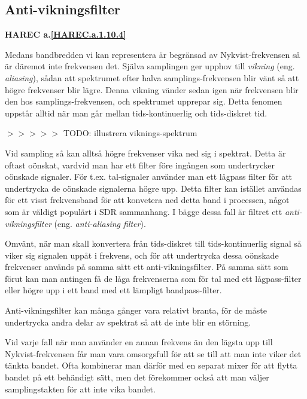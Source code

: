 \subsection{Anti-vikningsfilter}
\textbf{HAREC a.\ref{HAREC.a.1.10.4}\label{myHAREC.a.1.10.4}}

\begin{rev-nytt}[MAD]

Medans bandbredden vi kan representera är begränsad av Nykvist-frekvensen så
är däremot inte frekvensen det. Själva samplingen ger upphov till
\emph{vikning} (eng. \emph{aliasing}),
sådan att spektrumet efter halva samplings-frekvensen blir vänt så att högre
frekvenser blir lägre. Denna vikning vänder sedan igen när frekvensen blir
den hos samplings-frekvensen, och spektrumet upprepar sig. Detta fenomen
uppstår alltid när man går mellan tids-kontinuerlig och tids-diskret tid.

$>>>>>$ TODO: illustrera viknings-spektrum

Vid sampling så kan alltså högre frekvenser vika ned sig i spektrat. Detta är
oftast oönskat, vardvid man har ett filter före ingången som undertrycker
oönskade signaler. För t.ex. tal-signaler använder man ett lågpass filter för
att undertrycka de oönskade signalerna högre upp. Detta filter kan istället
användas för ett visst frekvensband för att konvetera ned detta band i
processen, något som är väldigt populärt i SDR sammanhang. I bägge dessa fall
är filtret ett \emph{anti-vikningsfilter} (eng. \emph{anti-aliasing filter}).

Omvänt, när man skall konvertera från tids-diskret till tids-kontinuerlig
signal så viker sig signalen uppåt i frekvens, och för att undertrycka dessa
oönskade frekvenser används på samma sätt ett anti-vikningsfilter. På samma
sätt som förut kan man antingen få de låga frekvenserna som för tal med ett
lågpass-filter eller högre upp i ett band med ett lämpligt bandpass-filter.

Anti-vikningsfilter kan många gånger vara relativt branta, för de måste
undertrycka andra delar av spektrat så att de inte blir en störning.

Vid varje fall när man använder en annan frekvens än den lägsta upp till
Nykvist-frekvensen får man vara omsorgsfull för att se till att man inte viker
det tänkta bandet. Ofta kombinerar man därför med en separat mixer för att
flytta bandet på ett behändigt sätt, men det förekommer också att man väljer
samplingstakten för att inte vika bandet.

\end{rev-nytt}

